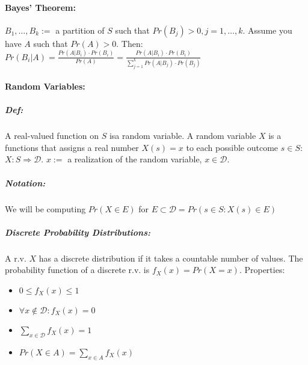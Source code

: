 \documentclass[landscape,10pt]{article}
\begin{document}
\begin{multicols}{3}
        \paragraph*{Bayes' Theorem:}
            $B_1, \ldots, B_k :=$ a partition of $S$ such that $Pr(B_j) > 0, j = 1, \ldots, k$. Assume you have $A$ such that $Pr(A) > 0$. Then: $Pr(B_i|A) = \frac{Pr(A|B_i) \cdot Pr(B_i)}{Pr(A)} = \frac{Pr(A|B_i) \cdot Pr(B_i)}{\sum\limits_{j=1}^{k}Pr(A|B_j) \cdot Pr(B_j)}$
        
        \paragraph*{Random Variables:}
            \subparagraph*{Def:}
                A real-valued function on $S$ isa  random variable. A random variable $X$ is a functions that assigns a real number $X(s)=x$ to each possible outcome $s \in S$: $X:S \Rightarrow \mathcal{D}$. $x:=$ a realization of the random variable, $x \in \mathcal{D}$.
            \subparagraph*{Notation: } 
                We will be computing $Pr(X \in E)$ for $E \subset \mathcal{D} = Pr(s \in S: X(s) \in E)$
            \subparagraph*{Discrete Probability Distributions: }
                A r.v. $X$ has a discrete distribution if it takes a countable number of values. The probability function of a discrete r.v. is $f_X(x) = Pr(X=x)$. Properties:

                \begin{itemize}
                    \item[] $0 \leq f_X(x) \leq 1$
                    \item[] $\forall x \notin \mathcal{D}: f_X(x) = 0$
                    \item[] $\sum\limits_{x \in \mathcal{D}} f_X(x) = 1$
                    \item[] $Pr(X \in A) = \sum\limits_{x \in A} f_X (x)$
                \end{itemize}


\end{multicols}
\end{document}

